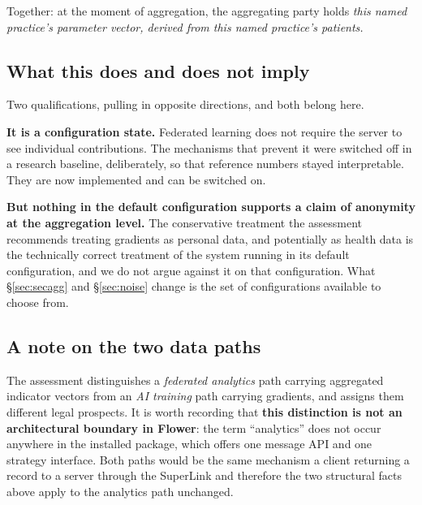 Together: at the moment of aggregation, the aggregating party holds \emph{this named practice's
parameter vector, derived from this named practice's patients.}

\subsection{What this does and does not imply}

Two qualifications, pulling in opposite directions, and both belong here.

\textbf{It is a configuration state.} Federated learning does not
require the server to see individual contributions. The mechanisms that prevent it were switched off
in a research baseline, deliberately, so that reference numbers stayed interpretable. They are now
implemented and can be switched on.

\textbf{But nothing in the default configuration supports a claim of anonymity at the aggregation
level.} The conservative treatment the assessment recommends treating gradients as personal
data, and potentially as health data is the technically correct treatment of the system running
in its default configuration, and we do not argue against it on that configuration. What
\S\ref{sec:secagg} and \S\ref{sec:noise} change is the set of configurations available to choose from.

\subsection{A note on the two data paths}

The assessment distinguishes a \emph{federated analytics} path carrying aggregated indicator vectors
from an \emph{AI training} path carrying gradients, and assigns them different legal prospects. It
is worth recording that \textbf{this distinction is not an architectural boundary in Flower}: the
term ``analytics'' does not occur anywhere in the installed package, which offers one message API
and one strategy interface. Both paths would be the same mechanism a client returning a record
to a server through the SuperLink and therefore the two structural facts above apply to the
analytics path unchanged.
